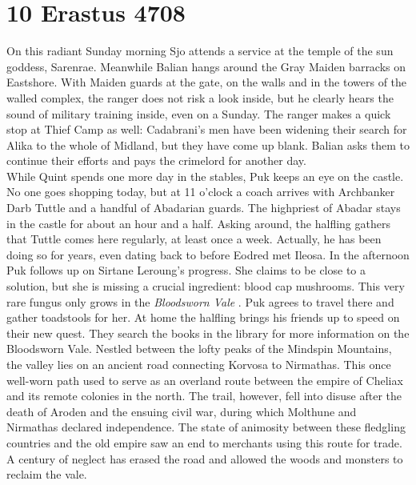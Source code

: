 \section{10 Erastus 4708}

On this radiant Sunday morning Sjo attends a service at the temple of the sun goddess, Sarenrae. Meanwhile Balian hangs around the Gray Maiden barracks on Eastshore. With Maiden guards at the gate, on the walls and in the towers of the walled complex, the ranger does not risk a look inside, but he clearly hears the sound of military training inside, even on a Sunday. The ranger makes a quick stop at Thief Camp as well: Cadabrani's men have been widening their search for Alika to the whole of Midland, but they have come up blank. Balian asks them to continue their efforts and pays the crimelord for another day.\\

While Quint spends one more day in the stables, Puk keeps an eye on the castle. No one goes shopping today, but at 11 o'clock a coach arrives with Archbanker Darb Tuttle and a handful of Abadarian guards. The highpriest of Abadar stays in the castle for about an hour and a half. Asking around, the halfling gathers that Tuttle comes here regularly, at least once a week. Actually, he has been doing so for years, even dating back to before Eodred met Ileosa. In the afternoon Puk follows up on Sirtane Leroung's progress. She claims to be close to a solution, but she is missing a crucial ingredient: blood cap mushrooms. This very rare fungus only grows in the {\itshape Bloodsworn Vale} . Puk agrees to travel there and gather toadstools for her. At home the halfling brings his friends up to speed on their new quest. They search the books in the library for more information on the Bloodsworn Vale. Nestled between the lofty peaks of the Mindspin Mountains, the valley lies on an ancient road connecting Korvosa to Nirmathas. This once well-worn path used to serve as an overland route between the empire of Cheliax and its remote colonies in the north. The trail, however, fell into disuse after the death of Aroden and the ensuing civil war, during which Molthune and Nirmathas declared independence. The state of animosity between these fledgling countries and the old empire saw an end to merchants using this route for trade. A century of neglect has erased the road and allowed the woods and monsters to reclaim the vale.\\

